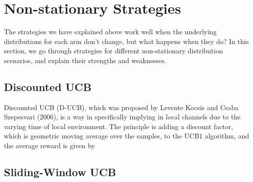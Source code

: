 \section{Non-stationary Strategies}
The strategies we have explained above work well when the underlying distributions for each arm don't change, but what happens when they do? In this section, we go through strategies for different non-stationary distribution scenarios, and explain their strengths and weaknesses.

\subsection{Discounted UCB}
Discounted UCB (D-UCB), which was proposed by Levente Kocsis and Csaba Szepesvari (2006), is a way in specifically implying in local channels due to the varying time of local environment. The principle is adding a discount factor, which is geometric moving average over the samples, to the UCB1 algorithm, and the average reward is given by
\subsection{Sliding-Window UCB}
